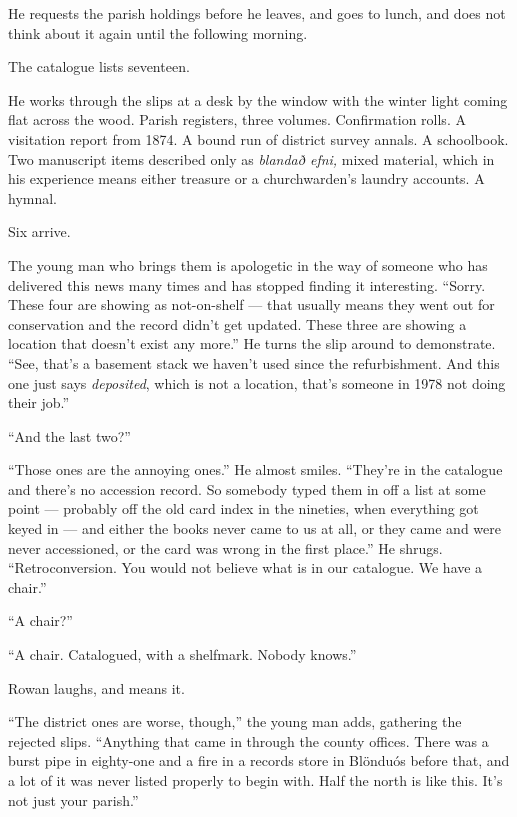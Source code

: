 \documentclass[11pt,oneside]{book}
\newcommand{\sceneline}{%
  \par\vspace{1.2em}
  \begin{center}
    \fontsize{11}{11}\selectfont \textbullet\quad\textbullet\quad\textbullet
  \end{center}
  \vspace{0.6em}\noindent\ignorespaces
}
\begin{document}
He requests the parish holdings before he leaves, and goes to lunch, and
does not think about it again until the following morning.

\sceneline

The catalogue lists seventeen.

He works through the slips at a desk by the window with the winter light
coming flat across the wood. Parish registers, three volumes.
Confirmation rolls. A visitation report from 1874. A bound run of
district survey annals. A schoolbook. Two manuscript items described
only as \emph{blandað efni,} mixed material, which in his experience
means either treasure or a churchwarden's laundry accounts. A hymnal.

Six arrive.

The young man who brings them is apologetic in the way of someone who
has delivered this news many times and has stopped finding it
interesting. ``Sorry. These four are showing as not-on-shelf --- that
usually means they went out for conservation and the record didn't get
updated. These three are showing a location that doesn't exist any
more.'' He turns the slip around to demonstrate. ``See, that's a
basement stack we haven't used since the refurbishment. And this one
just says \emph{deposited}, which is not a location, that's someone in
1978 not doing their job.''

``And the last two?''

``Those ones are the annoying ones.'' He almost smiles. ``They're in the
catalogue and there's no accession record. So somebody typed them in off
a list at some point --- probably off the old card index in the
nineties, when everything got keyed in --- and either the books never
came to us at all, or they came and were never accessioned, or the card
was wrong in the first place.'' He shrugs. ``Retroconversion. You would
not believe what is in our catalogue. We have a chair.''

``A chair?''

``A chair. Catalogued, with a shelfmark. Nobody knows.''

Rowan laughs, and means it.

``The district ones are worse, though,'' the young man adds, gathering
the rejected slips. ``Anything that came in through the county offices.
There was a burst pipe in eighty-one and a fire in a records store in
Blönduós before that, and a lot of it was never listed properly to begin
with. Half the north is like this. It's not just your parish.''
\end{document}
